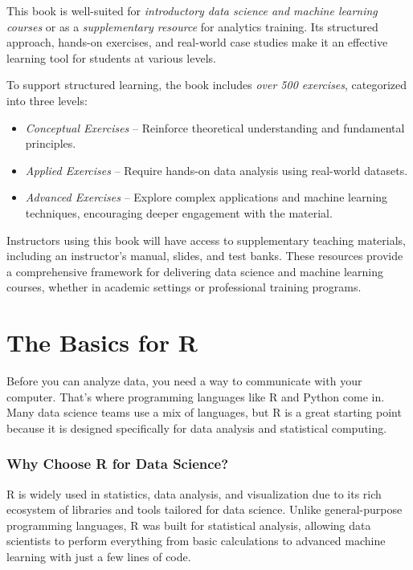 \documentclass[
  11pt,
]{book}
\providecommand{\tightlist}{%
  \setlength{\itemsep}{0pt}\setlength{\parskip}{0pt}}
\theoremstyle{definition}
\theoremstyle{definition}
\theoremstyle{definition}
\theoremstyle{definition}
\theoremstyle{remark}
\begin{document}
This book is well-suited for \emph{introductory data science and machine learning courses} or as a \emph{supplementary resource} for analytics training. Its structured approach, hands-on exercises, and real-world case studies make it an effective learning tool for students at various levels.

To support structured learning, the book includes \emph{over 500 exercises}, categorized into three levels:

\begin{itemize}
\tightlist
\item
  \emph{Conceptual Exercises} -- Reinforce theoretical understanding and fundamental principles.\\
\item
  \emph{Applied Exercises} -- Require hands-on data analysis using real-world datasets.\\
\item
  \emph{Advanced Exercises} -- Explore complex applications and machine learning techniques, encouraging deeper engagement with the material.
\end{itemize}

Instructors using this book will have access to supplementary teaching materials, including an instructor's manual, slides, and test banks. These resources provide a comprehensive framework for delivering data science and machine learning courses, whether in academic settings or professional training programs.

\chapter{The Basics for R}\label{chapter-into-R}

Before you can analyze data, you need a way to communicate with your computer. That's where programming languages like R and Python come in. Many data science teams use a mix of languages, but R is a great starting point because it is designed specifically for data analysis and statistical computing.

\subsection*{Why Choose R for Data Science?}\label{why-choose-r-for-data-science}


R is widely used in statistics, data analysis, and visualization due to its rich ecosystem of libraries and tools tailored for data science. Unlike general-purpose programming languages, R was built for statistical analysis, allowing data scientists to perform everything from basic calculations to advanced machine learning with just a few lines of code.
\end{document}
